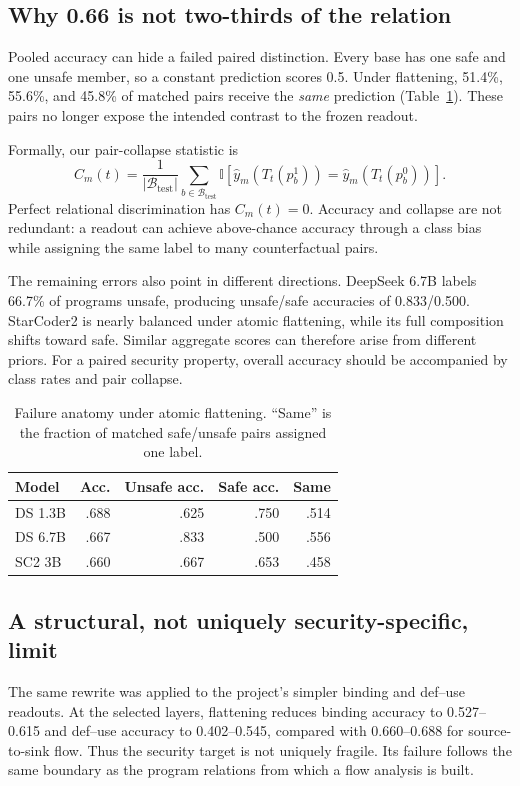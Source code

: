 \documentclass{article}
\begin{document}
\subsection{Why 0.66 is not two-thirds of the relation}
Pooled accuracy can hide a failed paired distinction. Every base has one safe and one unsafe member, so a constant prediction scores 0.5. Under flattening, 51.4\%, 55.6\%, and 45.8\% of matched pairs receive the \emph{same} prediction (Table~\ref{tab:failure}). These pairs no longer expose the intended contrast to the frozen readout.

Formally, our pair-collapse statistic is
\begin{equation}
 C_m(t)=\frac{1}{|\mathcal{B}_{\mathrm{test}}|}
 \sum_{b\in\mathcal{B}_{\mathrm{test}}}
 \mathbb{I}\!\left[
 \hat y_m(T_t(p_b^1))=\hat y_m(T_t(p_b^0))\right].
 \label{eq:collapse}
\end{equation}
Perfect relational discrimination has $C_m(t)=0$. Accuracy and collapse are
not redundant: a readout can achieve above-chance accuracy through a class
bias while assigning the same label to many counterfactual pairs.

The remaining errors also point in different directions. DeepSeek 6.7B labels 66.7\% of programs unsafe, producing unsafe/safe accuracies of 0.833/0.500. StarCoder2 is nearly balanced under atomic flattening, while its full composition shifts toward safe. Similar aggregate scores can therefore arise from different priors. For a paired security property, overall accuracy should be accompanied by class rates and pair collapse.

\begin{table}[t]
\centering\small
\caption{Failure anatomy under atomic flattening. ``Same'' is the fraction of matched safe/unsafe pairs assigned one label.}
\label{tab:failure}
\begin{tabular}{lrrrr}
\toprule
Model & Acc. & Unsafe acc. & Safe acc. & Same\\
\midrule
DS 1.3B & .688 & .625 & .750 & .514\\
DS 6.7B & .667 & .833 & .500 & .556\\
SC2 3B  & .660 & .667 & .653 & .458\\
\bottomrule
\end{tabular}
\end{table}

\subsection{A structural, not uniquely security-specific, limit}
The same rewrite was applied to the project's simpler binding and def--use readouts. At the selected layers, flattening reduces binding accuracy to 0.527--0.615 and def--use accuracy to 0.402--0.545, compared with 0.660--0.688 for source-to-sink flow. Thus the security target is not uniquely fragile. Its failure follows the same boundary as the program relations from which a flow analysis is built.
\end{document}
